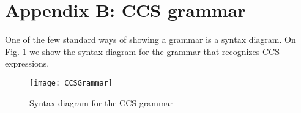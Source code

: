 \section*{Appendix B: CCS grammar}

One of the few standard ways of showing a grammar is a syntax diagram. On Fig. \ref{fig:CCSGrammar} we show the syntax diagram
for the grammar that recognizes CCS expressions.

\begin{figure}
\centering
\texttt{[image: CCSGrammar]}
\caption{Syntax diagram for the CCS grammar}
\label{fig:CCSGrammar}
\end{figure}